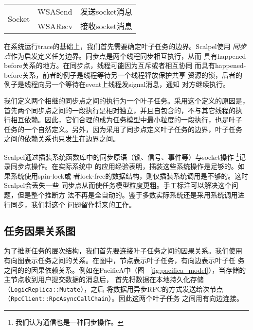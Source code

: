 \begin{table}[htbp]
\begin{minipage}{0.8\linewidth}
\begin{tabular}{lll}
\multirow{2}{*}{Socket} & WSASend & 发送socket消息 \\
                        & WSARecv & 接收socket消息 \\

\bottomrule[1.5pt]
\end{tabular}
\end{minipage}
\end{table}

在系统运行trace的基础上，我们首先需要确定叶子任务的边界。Scalpel使用
\emph{同步点}作为启发定义任务边界。同步点是两个线程同步相互执行，从而
具有happened-before关系的地方。在同步点，线程可能因为互斥或者相互协同
而具有happened-before关系，前者的例子是线程等待另一个线程释放保护共享
资源的锁，后者的例子是线程向另一个等待在event上线程发signal消息，通知
对方继续执行。

我们定义两个相继的同步点之间的执行为一个叶子任务。采用这个定义的原因是，
首先两个同步点之间的一段执行是相对独立，并且自包含的，不与其它线程的执
行相互依赖。因此，它们合理的成为任务模型中最小粒度的一段执行，也是叶子
任务的一个自然定义。另外，因为采用了同步点定义叶子任务的边界，叶子任务
之间的依赖关系也只发生在边界之间。

%

Scalpel通过插装系统函数库中的同步原语（锁、信号、事件等）与socket操作
\footnote{我们认为通信也是一种同步操作。}记录同步点操作。在实际系统中
的应用经验表明，插装这些系统操作是足够的。如果系统使用spin-lock或
者lock-free的数据结构，则仅插装系统调用是不够的。这时Scalpel会丢失一些
同步点从而使任务模型粒度更粗。手工标注可以解决这个问题，但是整个推断方
法不再是全自动的。鉴于多数实际系统还是采用系统调用进行同步，我们将这个
问题留作将来的工作。

\subsection{任务因果关系图}


为了推断任务的层次结构，我们首先要连接叶子任务之间的因果关系。我们使用
有向图表示任务之间的关系。在图中，节点表示叶子任务，有向边表示叶子任
务之间的的因果依赖关系。例如在PacificA中（图
~\ref{fig:pacifica_model}），当存储的主节点收到用户提交数据的消息后，
首先将数据在本地持久化存储（\texttt{Logic\-Replica\-::Mutate}），之后
将数据用异步RPC的方式发送给次节点
（\texttt{Rpc\-Client\-::RpcAsync\-Call\-Chain}）。因此这两个叶子任务
之间用有向边连接。

